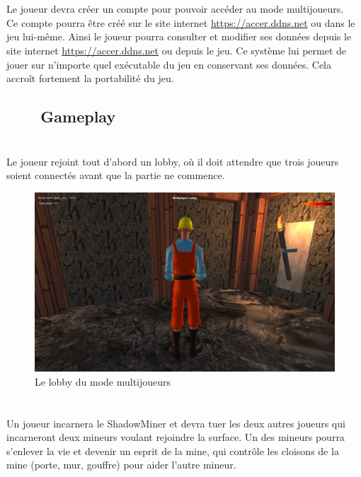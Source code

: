 \documentclass[titlepage, 13px, a4paper]{report}
\begin{document}
\paragraph*{} \hspace{0pt} \\
Le joueur devra créer un compte pour pouvoir accéder au mode multijoueurs. \\
Ce compte pourra être créé sur le site internet \url{https://accer.ddns.net} ou dans le jeu lui-même. Ainsi le joueur pourra 
consulter et modifier ses données depuis le site internet \url{https://accer.ddns.net} ou depuis le jeu. Ce système lui permet 
de jouer sur n’importe quel exécutable du jeu en conservant ses données. 
Cela accroît fortement la portabilité du jeu. \\

\subsection[Gameplay]{~~~~Gameplay}
\paragraph*{} \hspace{0pt} \\
Le joueur rejoint tout d’abord un lobby, où il doit attendre que trois joueurs 
soient connectés avant que la partie ne commence.

\begin{figure}[h!]
  \centering
  \includegraphics[scale=0.3]{images/multi_lobby.png}
  \caption{Le lobby du mode multijoueurs}
\end{figure}

\newpage

\paragraph*{} \hspace{0pt} \\
Un joueur incarnera le ShadowMiner et devra tuer les deux autres joueurs qui 
incarneront deux mineurs voulant rejoindre la surface. Un des mineurs pourra 
s’enlever la vie et devenir un esprit de la mine, qui contrôle les cloisons de 
la mine (porte, mur, gouffre) pour aider l’autre mineur. \\
\end{document}
